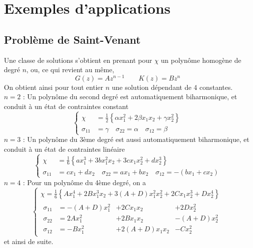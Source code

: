 \section{Exemples d'applications}\label{sec:Ch08-2}
\subsection{Problème de Saint-Venant}\label{ssec:Ch08-2.1}
Une classe de solutions s'obtient en prenant pour $\chi$ un polynôme homogène de degré $n$, ou, ce qui revient au même, 
\begin{equation}
  G(z)=Az^{n-1} \qquad K(z)=Bz^{n}
    \label{eq:Ch08-036}
\end{equation}
On obtient ainsi pour tout entier $n$ une solution dépendant de 4 constantes.
$n=2$ : Un polynôme du second degré est automatiquement biharmonique, et conduit à un état de contraintes constant 
\begin{equation}
  \left\{
  \begin{aligned}
    \chi        & = \frac{1}{2}\left\{\alpha x_1^2 + 2 \beta x_1 x_2 + \gamma x_2^2\right\} \\
    \sigma_{11} & = \gamma \quad \sigma_{22} = \alpha \quad \sigma_{12} = \beta
  \end{aligned}
  \right.
    \label{eq:Ch08-037}
\end{equation}
$n=3$ : Un polynôme du 3ème degré est aussi automatiquement biharmonique, et conduit à un état de contraintes linéaire 
\begin{equation}
  \left\{
  \begin{aligned}
    \chi        & = \frac{1}{6}\left\{a x_1^3 + 3 b x_1^2 x_2 + 3 c x_1 x_2^2 + d x_2^3\right\} \\
    \sigma_{11} & = c x_1 + d x_2 \quad \sigma_{22} = a x_1 + b x_2 \quad \sigma_{12} = -(b x_1 + c x_2)
  \end{aligned}
  \right.
    \label{eq:Ch08-038}
\end{equation}
$n=4$ : Pour un polynôme du 4ème degré, on a 
\begin{equation}
  \left\{
  \begin{aligned}
    \chi         = \frac{1}{6}\left\{A x_1^4 + 2 B x_1^3 x_2 + 3 (A+D) x_1^2x_2^2 + 2 C x_1 x_2^3 + D x_2^4\right\} \\
    \begin{aligned}
      \sigma_{11} & = -(A+D) x_1^2 &+    2 C x_1 x_2 &+   2 D x_2^2 \\
      \sigma_{22} & =    2 A x_1^2 &+    2 B x_1 x_2 &- (A+D) x_2^2 \\
      \sigma_{12} & =     -B x_1^2 &+ 2(A+D) x_1 x_2 &-     C x_2^2 
    \end{aligned}
  \end{aligned}
  \right.
    \label{eq:Ch08-039}
\end{equation}
et ainsi de suite. 

